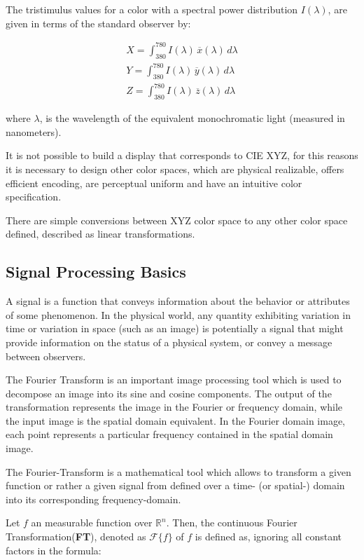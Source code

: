 The tristimulus values for a color with a spectral power distribution $I(\lambda)$, are given in terms of the standard observer by:

\begin{align*}
    X= \int_{380}^{780} I(\lambda)\,\overline{x}(\lambda)\,d\lambda \\
    Y= \int_{380}^{780} I(\lambda)\,\overline{y}(\lambda)\,d\lambda \\
    Z= \int_{380}^{780} I(\lambda)\,\overline{z}(\lambda)\,d\lambda
\end{align*}

where $\lambda$, is the wavelength of the equivalent monochromatic light (measured in nanometers).

It is not possible to build a display that corresponds to CIE XYZ, for this reasons it is necessary to design  other color spaces, which are physical realizable, offers efficient encoding, are perceptual uniform and have an intuitive color specification. 

There are simple conversions between XYZ color space to any other color space defined, described as linear transformations.

\subsection{Signal Processing Basics}
A signal is a function that conveys information about the behavior or attributes of some phenomenon.
In the physical world, any quantity exhibiting variation in time or variation in space (such as an image) is potentially a signal that might provide information on the status of a physical system, or convey a message between observers.

The Fourier Transform is an important image processing tool which is used to decompose an image into its sine and cosine components. The output of the transformation represents the image in the Fourier or frequency domain, while the input image is the spatial domain equivalent. In the Fourier domain image, each point represents a particular frequency contained in the spatial domain image. 

The Fourier-Transform is a mathematical tool which allows to transform a given function or rather a given signal from defined over a time- (or spatial-) domain into its corresponding frequency-domain.
 
Let $f$ an measurable function over $\mathds{R}^n$. Then, the continuous Fourier Transformation(\textbf{FT}), denoted as $\mathcal{F}\{f\}$ of $f$ is defined as, ignoring all constant factors in the formula:
 
